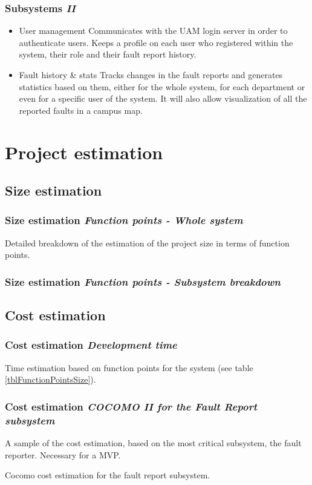 \documentclass[10pt, compress,usetitleprogressbar,aspectratio=1610]{beamer}
\begin{document}
\begin{frame}
\frametitle{Subsystems \hfill \emph{II}}
\begin{itemize}
\item \alert{User management} Communicates with the UAM login server in order to authenticate users. Keeps a profile on each user who registered within the system, their role and their fault report history.
\item \alert{Fault history \& stats} Tracks changes in the fault reports and generates statistics based on them, either for the whole system, for each department or even for a specific user of the system. It will also allow visualization of all the reported faults in a campus map.
\end{itemize}
\end{frame}

\section{Project estimation}

\subsection{Size estimation}
\begin{frame}
\frametitle{Size estimation \hfill \emph{Function points - Whole system}}
\begin{table}[hbtp]
\centering

\caption{Detailed breakdown of the estimation of the project size in terms of function points.}
\label{tblFunctionPointsSize}
\end{table}
\end{frame}

\begin{frame}
\frametitle{Size estimation \hfill \emph{Function points - Subsystem breakdown}}
\end{frame}

\subsection{Cost estimation}
\begin{frame}
\frametitle{Cost estimation \hfill \emph{Development time}}
\begin{table}[hbtp]
\centering

\caption{Time estimation based on function points for the system (see table \ref{tblFunctionPointsSize}).}
\label{tblFunctionPointsTime}
\end{table}
\end{frame}

\begin{frame}
\frametitle{Cost estimation \hfill \emph{COCOMO II for the Fault Report subsystem}}
A sample of the cost estimation, based on the most critical subsystem, the fault reporter. Necessary for a MVP.

\begin{table}[hbtp]

\caption{Cocomo cost estimation for the fault report subsystem.}
\label{tblFaultReportCost}
\end{table}

\end{frame}
\end{document}
